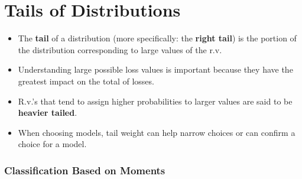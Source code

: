 \documentclass[]{book}
\theoremstyle{definition}
\theoremstyle{definition}
\theoremstyle{definition}
\theoremstyle{remark}
\begin{document}
\section{Tails of Distributions}\label{tails-of-distributions}

\begin{itemize}
\item
  The \textbf{tail} of a distribution (more specifically: the
  \textbf{right tail}) is the portion of the distribution corresponding
  to large values of the r.v.
\item
  Understanding large possible loss values is important because they
  have the greatest impact on the total of losses.
\item
  R.v.'s that tend to assign higher probabilities to larger values are
  said to be \textbf{heavier tailed}.
\item
  When choosing models, tail weight can help narrow choices or can
  confirm a choice for a model.
\end{itemize}

\subsubsection{Classification Based on
Moments}\label{classification-based-on-moments}
\end{document}

